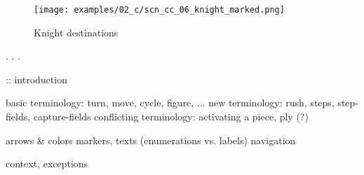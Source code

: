 \vspace*{-0.7\baselineskip}
\noindent
\begin{wrapfigure}[1]{l}{0.4\textwidth}
\centering
\texttt{[image: examples/02\_c/scn\_cc\_06\_knight\_marked.png]}
\vspace*{-1.4\baselineskip}
\caption{Knight destinations}
\label{fig:scn_cc_06_knight_marked}
\end{wrapfigure}
. . .

\clearpage %

\noindent
\TODO :: introduction \newline

\noindent
\textrightarrow basic terminology: turn, move, cycle, figure, ... \newline
\textrightarrow new terminology: rush, steps, step-fields, capture-fields \newline
\textrightarrow conflicting terminology: activating a piece, ply (?) \newline

\noindent
\textrightarrow arrows \& colors \newline
\textrightarrow markers, texts (enumerations vs. labels) \newline
\textrightarrow navigation \newline

\noindent
\textrightarrow context, exceptions \newline

\clearpage %
